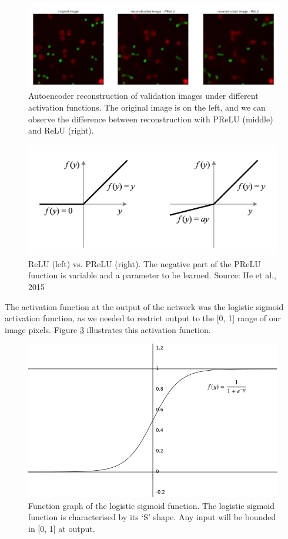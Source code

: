 \begin{figure}
    \centering
    \includegraphics[width=\textwidth]{dissertation/figures/relu_prelu_reconstruction.png}
    \caption{Autoencoder reconstruction of validation images under different activation functions. The original image is on the left, and we can observe the difference between reconstruction with PReLU (middle) and ReLU (right).}
    \label{fig:relu_prelu_reconstruction}
\end{figure}

\begin{figure}[h]
    \centering
    \includegraphics[width=.6\textwidth]{dissertation/figures/relu_prelu.png}
    \caption{ReLU (left) vs. PReLU (right). The negative part of the PReLU function is variable and a parameter to be learned. Source: He et al., 2015}
    \label{fig:relu_prelu}
\end{figure}

The activation function at the output of the network was the logistic sigmoid activation function, as we needed to restrict output to the [0, 1] range of our image pixels. Figure \ref{fig:sigmoid} illustrates this activation function.

\begin{figure}[h]
    \centering
    \includegraphics[width=.5\textwidth]{dissertation/figures/sigmoid.png}
    \caption{Function graph of the logistic sigmoid function. The logistic sigmoid function is characterised by its `S' shape. Any input will be bounded in [0, 1] at output.}
    \label{fig:sigmoid}
\end{figure}

